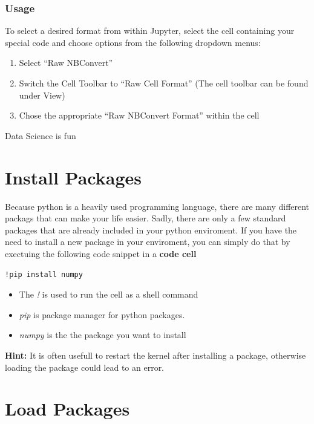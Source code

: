 \documentclass[
  letterpaper,
  DIV=11,
  numbers=noendperiod]{scrreprt}
\providecommand{\tightlist}{%
  \setlength{\itemsep}{0pt}\setlength{\parskip}{0pt}}\usepackage{longtable,booktabs,array}
\begin{document}
\hypertarget{usage}{%
\subsubsection{Usage}\label{usage}}

To select a desired format from within Jupyter, select the cell
containing your special code and choose options from the following
dropdown menus:

\begin{enumerate}
\def\labelenumi{\arabic{enumi}.}
\tightlist
\item
  Select ``Raw NBConvert''
\item
  Switch the Cell Toolbar to ``Raw Cell Format'' (The cell toolbar can
  be found under View)
\item
  Chose the appropriate ``Raw NBConvert Format'' within the cell
\end{enumerate}

Data Science is fun

\hypertarget{install-packages}{%
\section{Install Packages}\label{install-packages}}

Because python is a heavily used programming language, there are many
different packags that can make your life easier. Sadly, there are only
a few standard packages that are already included in your python
enviroment. If you have the need to install a new package in your
enviroment, you can simply do that by exectuing the following code
snippet in a \textbf{code cell}

\texttt{!pip\ install\ numpy}

\begin{itemize}
\item
  The \emph{!} is used to run the cell as a shell command
\item
  \emph{pip} is package manager for python packages.
\item
  \emph{numpy} is the the package you want to install
\end{itemize}

\textbf{Hint:} It is often usefull to restart the kernel after
installing a package, otherwise loading the package could lead to an
error.

\hypertarget{load-packages}{%
\section{Load Packages}\label{load-packages}}
\end{document}
